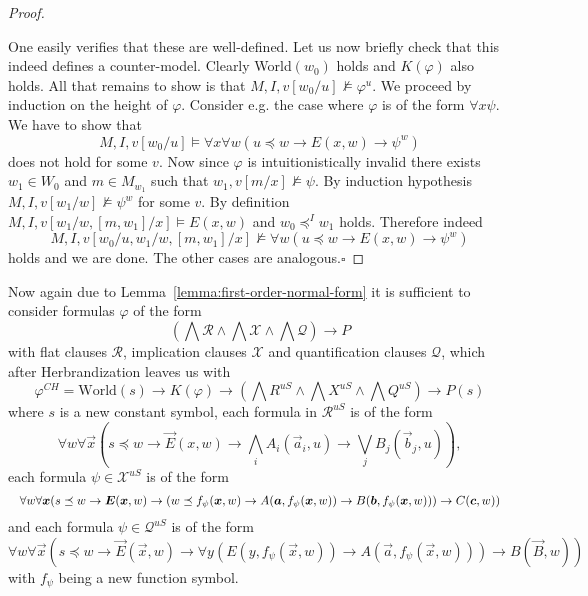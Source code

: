 \documentclass[runningheads]{llncs}
\begin{document}
\begin{proof}
\begin{itemize}
	\end{itemize}
	One easily verifies that these are well-defined. Let us now briefly check that this indeed defines a counter-model. Clearly World$(w_0)$ holds and $K(\varphi)$ also holds. All that remains to show is that $M, I, v[w_0/u]\not\models\varphi^u$. We proceed by induction on the height of $\varphi$. Consider e.g. the case where $\varphi$ is of the form $\forall x\psi$.
	We have to show that
	$$M, I, v[w_0/u]\models \forall x\forall w(u\preceq w\to E(x, w)\to \psi^w)$$
	does not hold for some $v$. Now since $\varphi$ is intuitionistically invalid there exists $w_1\in W_0$ and $m\in M_{w_1}$ such that $w_1, v[m/x]\not\models\psi$. By induction hypothesis $M, I, v[w_1/w]\not\models\psi^w$ for some $v$. By definition $M, I, v[w_1/w, [m, w_1]/x]\models E(x, w)$ and $w_0\preceq^I w_1$ holds. Therefore indeed $$M, I, v[w_0/u, w_1/w, [m, w_1]/x]\not\models \forall w(u\preceq w\to E(x, w)\to \psi^w)$$ holds and we are done. The other cases are analogous.\hfill$\square$
\end{proof}



Now again due to Lemma~\ref{lemma:first-order-normal-form} it is sufficient to consider formulas $\varphi$ of the form $$\left(\bigwedge\mathcal R\wedge\bigwedge\mathcal X\wedge\bigwedge\mathcal Q\right)\to P$$ with flat clauses $\mathcal R$, implication clauses $\mathcal X$ and quantification clauses $\mathcal Q$, which after Herbrandization leaves us with $$\varphi^{CH} = \text{World}(s)\to K(\varphi)\to\left(\bigwedge R^{uS}\wedge \bigwedge X^{uS}\wedge\bigwedge Q^{uS}\right)\to P(s)$$
where $s$ is a new constant symbol, each formula in $\mathcal R^{uS}$ is of the form
$$\forall w \forall \vec x(s\preceq w\to\vec E(x, w)\to\bigwedge_i A_i(\vec a_i, u)\to\bigvee_j B_j(\vec b_j, u)),$$
each formula $\psi\in\mathcal X^{uS}$ is of the form
$$
	\resizebox{\hsize}{!}{$\forall w\forall\vec x(s\preceq w\to\vec E(\vec x, w)\to (w\preceq f_\psi(\vec x, w)\to A(\vec a, f_\psi(\vec x, w))\to B(\vec b, f_\psi(\vec x, w)))\to C(\vec c, w))$}
$$
and each formula $\psi\in\mathcal Q^{uS}$ is of the form
$$\forall w\forall\vec x(s\preceq w\to\vec E(\vec x, w)\to \forall y(E(y, f_\psi(\vec x, w))\to A(\vec a, f_\psi(\vec x, w)))\to B(\vec B, w))$$
with $f_\psi$ being a new function symbol.
\end{document}
